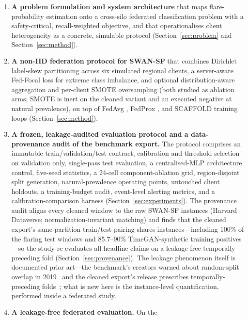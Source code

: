 \begin{enumerate}[leftmargin=2em, itemsep=3pt]
  \item \textbf{A problem formulation and system architecture} that maps
  flare-probability estimation onto a cross-silo federated
  classification problem with a safety-critical, recall-weighted
  objective, and that operationalises client heterogeneity as a
  concrete, simulable protocol (Section~\ref{sec:problem} and
  Section~\ref{sec:method}).
  \item \textbf{A non-IID federation protocol for SWAN-SF} that combines
  Dirichlet label-skew partitioning across six simulated regional
  clients, a server-aware Fed-Focal loss \cite{sarkar2020} for extreme
  class imbalance, and optional distribution-aware aggregation and
  per-client SMOTE oversampling (both studied as ablation arms; SMOTE
  is inert on the cleaned variant and an executed negative at natural
  prevalence), on top of FedAvg
  \cite{mcmahan2017}, FedProx \cite{li2020}, and SCAFFOLD
  \cite{karimireddy2020} training loops
  (Section~\ref{sec:method}).
  \item \textbf{A frozen, leakage-audited evaluation protocol and a
  data-provenance audit of the benchmark export.} The protocol
  comprises an immutable train/validation/test contract, calibration
  and threshold selection on validation only, single-pass test
  evaluation, a centralised-MLP architecture control, five-seed
  statistics, a 24-cell component-ablation grid, region-disjoint
  split generation, natural-prevalence operating points, untouched
  client holdouts, a training-budget audit, event-level alerting
  metrics, and a calibration-comparison harness
  (Section~\ref{sec:experiments}). The provenance audit aligns every
  cleaned window to the raw SWAN-SF instances (Harvard Dataverse;
  normalization-invariant matching) and finds that the cleaned
  export's same-partition train/test pairing shares instances---including 100\% of the flaring test windows and 85.7--90\%
  TimeGAN-synthetic training positives---so the study re-evaluates all
  headline claims on a leakage-free temporally-preceding fold
  (Section~\ref{sec:provenance}). The leakage phenomenon itself is
  documented prior art---the benchmark's creators warned about
  random-split overlap in 2019~\cite{angryk2019} and the cleaned
  export's release prescribes temporally-preceding
  folds~\cite{eskandari2024}; what is new here is the instance-level
  quantification, performed inside a federated study.
  \item \textbf{A leakage-free federated evaluation.} On the

\end{enumerate}
